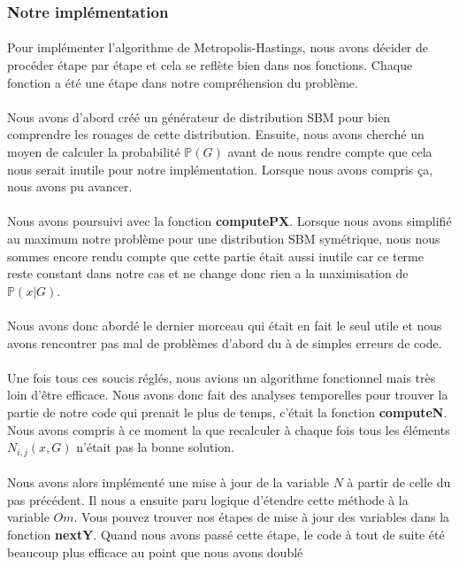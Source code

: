 \subsubsection*{Notre implémentation}
\paragraph*{}
Pour implémenter l'algorithme de Metropolis-Hastings, nous avons décider de 
procéder étape par étape et cela se reflète bien dans nos fonctions. Chaque 
fonction a été une étape dans notre compréhension du problème. 
\\\\
Nous avons d'abord créé un générateur de distribution SBM pour bien comprendre les 
rouages de cette distribution. Ensuite, nous avons cherché un moyen de calculer
la probabilité $\mathbb{P}(G)$ avant de nous rendre compte que cela nous serait inutile 
pour notre implémentation. Lorsque nous avons compris ça, nous avons pu avancer.
\\\\
Nous avons poursuivi avec la fonction \textbf{computePX}. Lorsque nous avons simplifié au maximum 
notre problème pour une distribution SBM symétrique, nous nous sommes encore rendu compte
que cette partie était aussi inutile car ce terme reste constant dans notre cas et ne change 
donc rien a la maximisation de $\mathbb{P}(x|G)$. 
\\\\
Nous avons donc abordé le dernier morceau qui était en fait le seul utile et 
nous avons rencontrer pas mal de problèmes d'abord du à de simples erreurs de code. 
\\\\
Une fois tous ces soucis réglés, nous avions un algorithme fonctionnel mais 
très loin d'être efficace. Nous avons donc fait des analyses temporelles pour trouver la partie 
de notre code qui prenait le plus de temps, c'était la fonction \textbf{computeN}. Nous avons compris
à ce moment la que recalculer à chaque fois tous les éléments $N_{i,j}(x,G)$ n'était pas la bonne 
solution. 
\\\\
Nous avons alors implémenté une mise à jour de la variable $N$ à partir de celle du pas
précédent. Il nous a ensuite paru logique d'étendre cette méthode à la variable $Om$. Vous pouvez 
trouver nos étapes de mise à jour des variables dans la fonction \textbf{nextY}. Quand nous avons
passé cette étape, le code à tout de suite été beaucoup plus efficace au point que nous avons doublé
